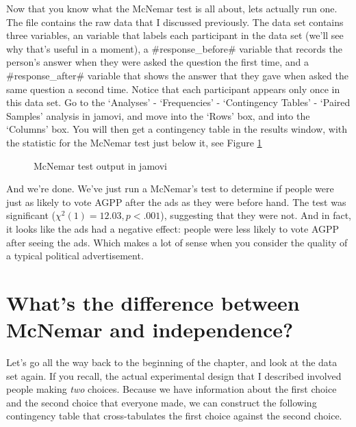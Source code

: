 
Now that you know what the McNemar test is all about, lets actually run one. The  file contains the raw data that I discussed previously. The  data set contains three variables, an  variable that labels each participant in the data set (we'll see why that's useful in a moment), a \rtextverb#response_before# variable that records the person's answer when they were asked the question the first time, and a \rtextverb#response_after# variable that shows the answer that they gave when asked the same question a second time. Notice that each participant appears only once in this data set. Go to the `Analyses' - `Frequencies' - `Contingency Tables' - `Paired Samples' analysis in jamovi, and move into the `Rows' box, and into the `Columns' box. You will then get a contingency table in the results window, with the statistic for the McNemar test just below it, see Figure \ref{fig:McNemar}

\begin{figure}
\begin{center}
\caption{McNemar test output in jamovi}
\label{fig:McNemar}
\HR
\end{center}
\end{figure}

And we're done. We've just run a McNemar's test to determine if people were just as likely to vote AGPP after the ads as they were before hand. The test was significant ($\chi^2(1) = 12.03, p<.001$), suggesting that they were not. And in fact, it looks like the ads had a negative effect: people were less likely to vote AGPP after seeing the ads. Which makes a lot of sense when you consider the quality of a typical political advertisement.


\section{What's the difference between McNemar and independence?}

Let's go all the way back to the beginning of the chapter, and look at the  data set again. If you recall, the actual experimental design that I described involved people making {\it two} choices. Because we have information about the first choice and the second choice that everyone made, we can construct the following contingency table that cross-tabulates the first choice against the second choice.

